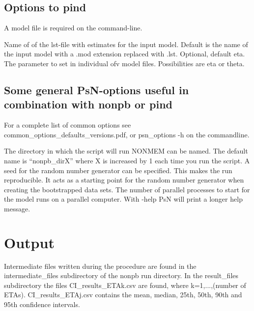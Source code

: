 \subsection{Options to pind}
A model file is required on the command-line.
\begin{optionlist}
Name of  of the lst-file with estimates for the input model. Default is the name of the input model with a .mod extension replaced with .lst. 
\nextopt
{}
Optional, default eta. The parameter to set in individual ofv model files. Possibilities are eta or theta. 
\nextopt
\end{optionlist}

\subsection{Some general PsN-options useful in combination with nonpb or pind}
For a complete list of common options see common\_options\_defaults\_versions.pdf, or psn\_options -h on the commandline.
\begin{optionlist}
The directory in which the script will run NONMEM can be named. The default name is “nonpb\_dirX” where X is increased by 1 each time you run the script. 
\nextopt
{}
A seed for the random number generator can be specified. This makes the run reproducible. It acts as a starting point for the random number generator when creating the bootstrapped data sets. 
\nextopt
{}
The number of parallel processes to start for the model runs on a parallel computer. 
\nextopt
{}
With -help PsN will print a longer help message. 
\nextopt
\end{optionlist}

\section{Output}
Intermediate files written during the procedure are found in the intermediate\_files subdirectory of the nonpb run directory. In the result\_files subdirectory the files CI\_results\_ETAk.csv are found, where k=1,...,(number of ETAs). CI\_results\_ETAj.csv contains the mean, median, 25th, 50th, 90th and 95th confidence intervals.

